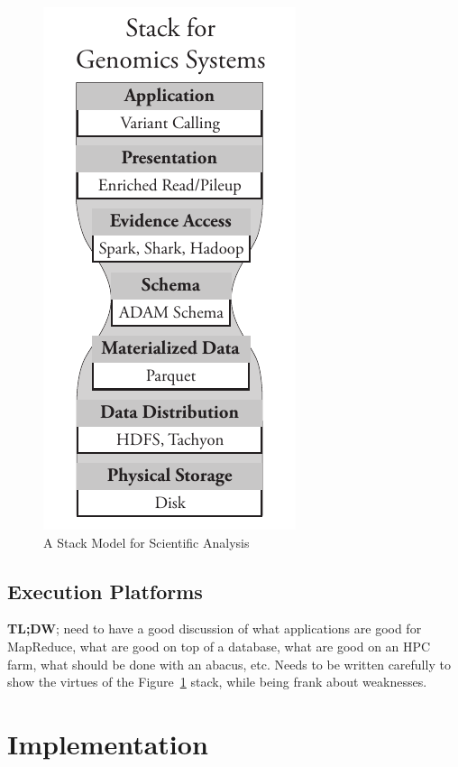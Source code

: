 \documentclass{acm_proc_article-sp}
\begin{document}
\begin{figure}[h]
\begin{center}
\includegraphics[width=0.6\linewidth]{stack-model.pdf}
\end{center}
\caption{A Stack Model for Scientific Analysis}
\label{fig:stack-model}
\end{figure}

\subsection{Execution Platforms}
\label{sec:execution-platforms}

\textbf{TL;DW}; need to have a good discussion of what applications are good for MapReduce, what
are good on top of a database, what are good on an HPC farm, what should be done with an
abacus, etc. Needs to be written carefully to show the virtues of the Figure~\ref{fig:stack-model}
stack, while being frank about weaknesses.

\section{Implementation}
\label{sec:implementation}
\end{document}
